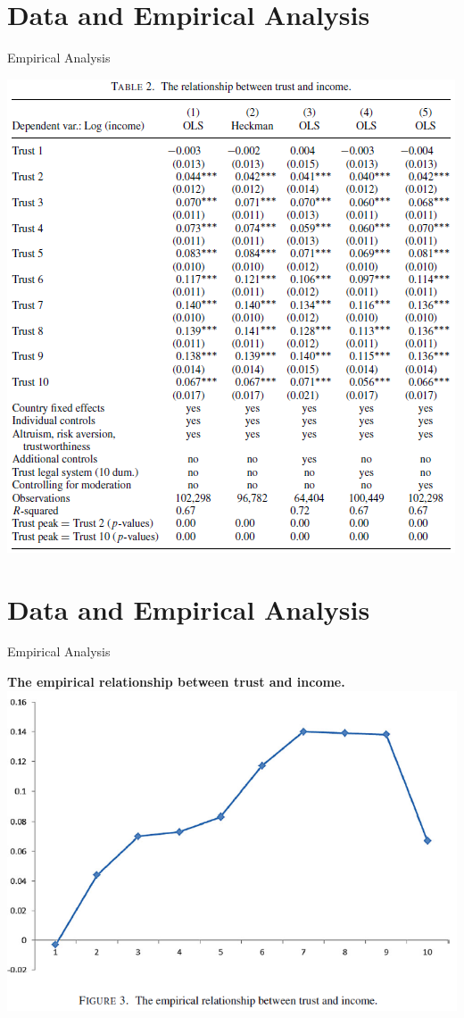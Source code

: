 \documentclass[pdftex,12pt,xcolor=pdftex,table]{beamer}
\begin{document}
\section{Data and Empirical Analysis}
\begin{frame}{Empirical Analysis}
    \begin{center}
        \includegraphics[scale=0.53]{table_2.PNG}
    \end{center}
\end{frame}

\section{Data and Empirical Analysis}
\begin{frame}{Empirical Analysis}
    \begin{center}
            \textbf{The empirical relationship between trust and income.}
        \includegraphics[scale=0.50]{figure_3.PNG}
    \end{center}
\end{frame}
\end{document}

